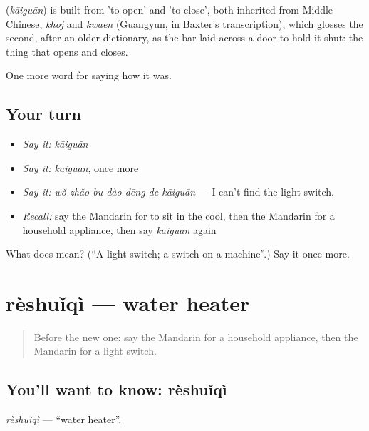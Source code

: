 \begin{cousinweb}
\textbf{} (\emph{kāiguān}) is built from  'to open' and  'to close', both inherited from Middle Chinese, \emph{khoj} and \emph{kwaen} (Guangyun, in Baxter's transcription), which glosses the second, after an older dictionary, as the bar laid across a door to hold it shut: the thing that opens and closes.
\end{cousinweb}

\begin{grammarlens}[title={What you've built}]
One more word for saying how it was.
\end{grammarlens}

\subsection*{Your turn}
\begin{itemize}
\raggedright
  \item \emph{Say it:} \emph{kāiguān}
  \item \emph{Say it:} \emph{kāiguān}, once more
  \item \emph{Say it:} \emph{wǒ zhǎo bu dào dēng de kāiguān} — I can't find the light switch.
  \item \emph{Recall:} say the Mandarin for to sit in the cool, then the Mandarin for a household appliance, then say \emph{kāiguān} again
\end{itemize}

\begin{tcolorbox}[breakable,colback=teal!4,colframe=teal!35!black,title={Before you move on}]
What does  mean? (\textquotedblleft{}A light switch; a switch on a machine\textquotedblright{}.) Say it once more.
\end{tcolorbox}
\section[rèshuǐqì]{rèshuǐqì — water heater}

\label{lesson:ZH-C520-reshuiqi}



\begin{quote}
Before the new one: say the Mandarin for a household appliance, then the Mandarin for a light switch.
\end{quote}

\subsection*{You'll want to know: rèshuǐqì}
\emph{rèshuǐqì} — \textquotedblleft{}water heater\textquotedblright{}.


